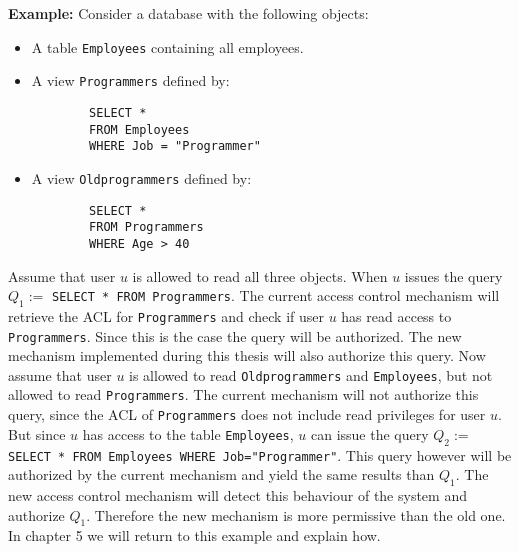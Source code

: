 \smallskip
\noindent
{\bf Example:}
%
Consider a database with the following objects:
%
\begin{itemize}
	\item A table \texttt{Employees} containing all employees.
	\item A view \texttt{Programmers} defined by:
		\begin{verbatim}
		SELECT * 
		FROM Employees
		WHERE Job = "Programmer"
		\end{verbatim}
	\item A view \texttt{Oldprogrammers} defined by:
		\begin{verbatim}
		SELECT *
		FROM Programmers
		WHERE Age > 40
		\end{verbatim}
\end{itemize}
%
Assume that user $u$ is allowed to read all three objects. When $u$ issues the query $Q_1 := $ \texttt{SELECT * FROM Programmers}. 
%
The current access control mechanism will retrieve the ACL for \texttt{Programmers} and check if user $u$ has read access to \texttt{Programmers}. 
%
Since this is the case the query will be authorized.
%
The new mechanism implemented during this thesis will also authorize this query.
%
Now assume that user $u$ is allowed to read \texttt{Oldprogrammers} and \texttt{Employees}, but not allowed to read \texttt{Programmers}.
%
The current mechanism will not authorize this query, since the ACL of \texttt{Programmers} does not include read privileges for user $u$.
%
But since $u$ has access to the table \texttt{Employees}, $u$ can issue the query $Q_2 := $ \texttt{SELECT * FROM Employees WHERE Job="Programmer"}.
%
This query however will be authorized by the current mechanism and yield the same results than $Q_1$.
%
The new access control mechanism will detect this behaviour of the system and authorize $Q_1$.
%
Therefore the new mechanism is more permissive than the old one.
%
In chapter 5 we will return to this example and explain how.

